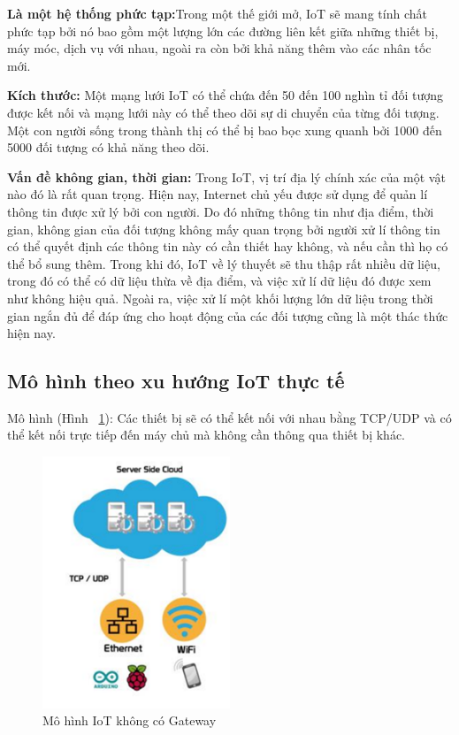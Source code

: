 \textbf{Là một hệ thống phức tạp:}Trong một thế giới mở, IoT sẽ mang tính chất phức tạp bởi nó bao gồm một lượng lớn các đường liên kết giữa những thiết bị, máy móc, dịch vụ với nhau, ngoài ra còn bởi khả năng thêm vào các nhân tốc mới.

\textbf{Kích thước: } Một mạng lưới IoT có thể chứa đến 50 đến 100 nghìn tỉ đối tượng được kết nối và mạng lưới này có thể theo dõi sự di chuyển của từng đối tượng. Một con người sống trong thành thị có thể bị bao bọc xung quanh bởi 1000 đến 5000 đối tượng có khả năng theo dõi.

\textbf{Vấn đề không gian, thời gian: }Trong IoT, vị trí địa lý chính xác của một vật nào đó là rất quan trọng. Hiện nay, Internet chủ yếu được sử dụng để quản lí thông tin được xử lý bởi con người. Do đó những thông tin như địa điểm, thời gian, không gian của đối tượng không mấy quan trọng bởi người xử lí thông tin có thể quyết định các thông tin này có cần thiết hay không, và nếu cần thì họ có thể bổ sung thêm. Trong khi đó, IoT về lý thuyết sẽ thu thập rất nhiều dữ liệu, trong đó có thể có dữ liệu thừa về địa điểm, và việc xử lí dữ liệu đó được xem như không hiệu quả. Ngoài ra, việc xử lí một khối lượng lớn dữ liệu trong thời gian ngắn đủ để đáp ứng cho hoạt động của các đối tượng cũng là một thác thức hiện nay.

\newpage

\subsection*{Mô hình theo xu hướng IoT thực tế}
Mô hình (Hình ~\ref{fig:pic5}): Các thiết bị sẽ có thể kết nối với nhau bằng TCP/UDP và có thể kết nối trực tiếp đến máy chủ mà không cần thông qua thiết bị khác.

\begin{figure}[htbp!] 
\centering    
\includegraphics[width=0.5\textwidth]{pic5}
\caption[Mô hình IoT không có Gateway ]{Mô hình IoT không có Gateway}
\label{fig:pic5}
\end{figure}

